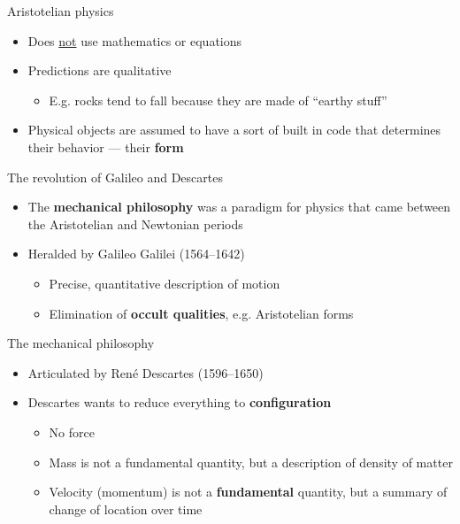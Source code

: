 \documentclass[fleqn]{beamer}
\newcommand{\kw}[1]{\textbf{#1}}
\begin{document}
\begin{frame}{Aristotelian physics}

  \begin{itemize}
  \item Does \ul{not} use mathematics or equations
  \item Predictions are qualitative
    \begin{itemize}
    \item E.g. rocks tend to fall because they are made of ``earthy
      stuff'' \end{itemize}
  \item Physical objects are assumed to have a sort of built in code
    that determines their behavior --- their \kw{form}
  \end{itemize}

\end{frame}


\begin{frame}{The revolution of Galileo and Descartes}

  \begin{itemize}
  \item The \kw{mechanical philosophy} was a paradigm for physics that
    came between the Aristotelian and Newtonian periods
  \item Heralded by Galileo Galilei (1564--1642)
    \begin{itemize}
    \item Precise, quantitative description of motion
    \item Elimination of \kw{occult qualities}, e.g. Aristotelian
      forms
    \end{itemize}
  \end{itemize}

\end{frame}

\begin{frame}{The mechanical philosophy}

  \begin{itemize}
  \item Articulated by Ren{\'e} Descartes (1596--1650)
  \item Descartes wants to reduce everything to \kw{configuration}
    \begin{itemize}
    \item No force
    \item Mass is not a fundamental quantity, but a description of
      density of matter
    \item Velocity (momentum) is not a \kw{fundamental} quantity, but
      a summary of change of location over time
    \end{itemize}
  \end{itemize}

\end{frame}
\end{document}
